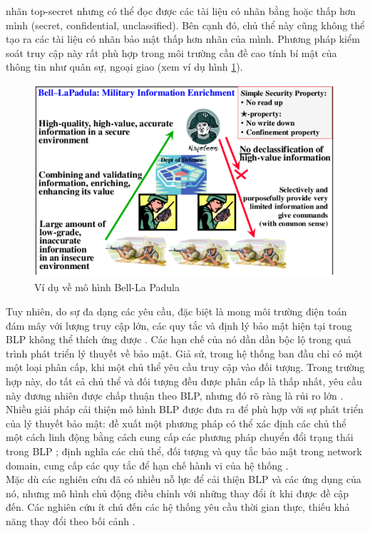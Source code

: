 nhãn top-secret nhưng có thể đọc được các tài liệu có nhãn bằng hoặc thấp hơn mình
(secret, confidential, unclassified). Bên cạnh đó, chủ thể này cũng không thể tạo ra các
tài liệu có nhãn bảo mật thấp hơn nhãn của mình. Phương pháp kiểm soát truy cập này rất phù hợp trong môi trường cần đề cao tính bí mật của thông tin như quân sự, ngoại
giao (xem ví dụ hình \ref{fig:chap2-blp-model}).
\begin{figure}
    \centering
    \includegraphics[scale=0.6]{graphics/chapter-2/chap2-blp-model.png}
    \caption{Ví dụ về mô hình Bell-La Padula}
    \label{fig:chap2-blp-model}
\end{figure}
Tuy nhiên, do sự đa dạng các yêu cầu, đặc biệt là mong môi trường điện toán đám
mây với lượng truy cập lớn, các quy tắc và định lý bảo mật hiện tại trong BLP không thể
thích ứng được \cite{tang2018self}.  Các hạn chế của nó dần dần bộc lộ trong quá trình phát triển lý
thuyết về bảo mật.
Giả sử, trong hệ thống ban đầu chỉ có một một loại phân cấp, khi một chủ thể yêu
cầu truy cập vào đối tượng. Trong trường hợp này, do tất cả chủ thể và đối tượng đều
được phân cấp là thấp nhất, yêu cầu này đương nhiên được chấp thuận theo BLP, nhưng
đó rõ ràng là rủi ro lớn \cite{mclean1990security}. \\
\indent Nhiều giải pháp cải thiện mô hình BLP được đưa ra để phù hợp với sự phát triển
của lý thuyết bảo mật: đề xuất một phương pháp có thể xác định các chủ thể một cách
linh động bằng cách cung cấp các phương pháp chuyển đổi trạng thái trong BLP \cite{zhu2016application}; định nghĩa các chủ thể, đối tượng và quy tắc bảo mật trong network domain, cung cấp
các quy tắc để hạn chế hành vi của hệ thống \cite{ou2009research}. \\
\indent Mặc dù các nghiên cứu đã có nhiều nỗ lực để cải thiện BLP và các ứng dụng của
nó, nhưng mô hình chủ động điều chỉnh với những thay đổi ít khi được đề cập đến. Các
nghiên cứu ít chú đến các hệ thống yêu cầu thời gian thực, thiếu khả năng thay đổi theo
bối cảnh \cite{yang2019using}.
